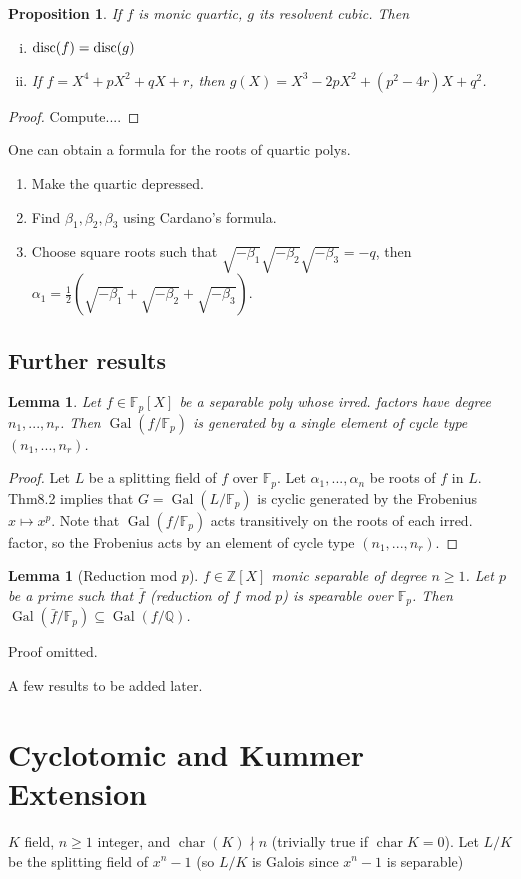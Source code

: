 \documentclass{article}
\theoremstyle{definition}
\theoremstyle{remark}
\theoremstyle{plain}
\newtheorem{lem}[defn]{Lemma}
\newtheorem{prop}[defn]{Proposition}
\newcommand{\ZZ}{\mathbb{Z}}
\newcommand{\QQ}{\mathbb{Q}}
\newcommand{\FF}{\mathbb{F}}
\newcommand{\Gal}{\operatorname{Gal}}
\begin{document}
\begin{prop}
    If $f$ is monic quartic, $g$ its resolvent cubic. Then \begin{enumerate}[(i)]
        \item $\operatorname{disc}(f)=\operatorname{disc}(g)$
        \item If $f=X^4+pX^2+qX+r$, then $g(X)=X^3-2pX^2+(p^2-4r)X+q^2$.
    \end{enumerate}
\end{prop}
\begin{proof}
    Compute....
\end{proof}
One can obtain a formula for the roots of quartic polys.
\begin{enumerate}
    \item Make the quartic depressed.
    \item Find $\beta_1,\beta_2,\beta_3$ using Cardano's formula.
    \item Choose square roots such that $\sqrt{-\beta_1}\sqrt{-\beta_2}\sqrt{-\beta_3}=-q$, then $\alpha_1=\frac12(\sqrt{-\beta_1}+\sqrt{-\beta_2}+\sqrt{-\beta_3})$.
\end{enumerate}
\subsection{Further results}
\begin{lem}
    Let $f\in\FF_p[X]$ be a separable poly whose irred. factors have degree $n_1,...,n_r$. Then $\Gal(f/\FF_p)$ is generated by a single element of cycle type $(n_1,...,n_r)$.
\end{lem}
\begin{proof}
    Let $L$ be a splitting field of $f$ over $\FF_p$. Let $\alpha_1,...,\alpha_n$ be roots of $f$ in $L$. Thm8.2 implies that $G=\Gal(L/\FF_p)$ is cyclic generated by the Frobenius $x\mapsto x^p$. Note that $\Gal(f/\FF_p)$ acts transitively on the roots of each irred. factor, so the Frobenius acts by an element of cycle type $(n_1,...,n_r)$.
\end{proof}
\begin{lem}[Reduction mod $p$]
    $f\in \ZZ[X]$ monic separable of degree $n\ge 1$. Let $p$ be a prime such that $\bar f$ (reduction of $f$ mod $p$) is spearable over $\FF_p$. Then $\Gal(\bar f/\FF_p)\subseteq\Gal(f/\QQ)$.
\end{lem}
Proof omitted.

A few results to be added later.

\section{Cyclotomic and Kummer Extension}
$K$ field, $n\ge 1$ integer, and $\operatorname{char}(K)\nmid n$ (trivially true if $\operatorname{char}{K}=0$). Let $L/K$ be the splitting field of $x^n-1$ (so $L/K$ is Galois since $x^n-1$ is separable)
\end{document}
